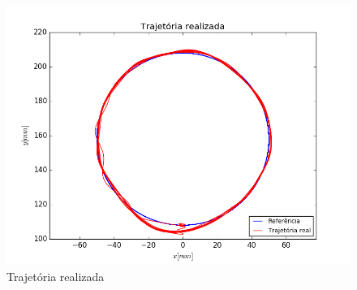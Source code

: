 \documentclass[]{politex}
\begin{document}
\begin{figure}[H]
	\centering
	\includegraphics[scale=0.39]{../../../Experimental/Aquisicoes/PIDSMCt_circulo/xy.png}  
	\caption{Trajetória realizada}
	\label{fig:PIDSMCq_circulo_xy}
\end{figure}
\end{document}
